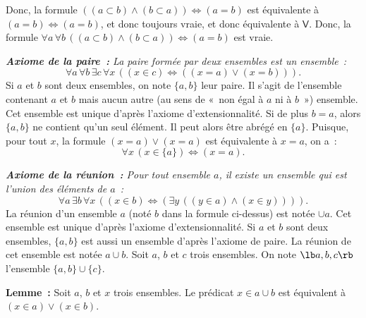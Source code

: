     Donc, la formule $((a \subset b) \wedge (b \subset a)) \Leftrightarrow (a = b)$ est équivalente à $(a = b) \Leftrightarrow (a = b)$, et donc toujours vraie, et donc équivalente à $\mathsf{V}$. 
    Donc, la formule $\forall a \, \forall b \, ((a \subset b) \wedge (b \subset a)) \Leftrightarrow (a = b)$ est vraie. 

    \done

\medskip

\noindent\textit{\textbf{Axiome de la paire :} La paire formée par deux ensembles est un ensemble :}
\begin{equation*}
    \forall a \, \forall b \, \exists c \, \forall x \, (
        (x \in c) \Leftrightarrow ((x = a) \vee (x = b))
    ).
\end{equation*}
Si $a$ et $b$ sont deux ensembles, on note $\lbrace a, b \rbrace$ leur paire. 
Il s'agit de l'ensemble contenant $a$ et $b$ mais aucun autre (au sens de « non égal à $a$ ni à $b$ ») ensemble. 
Cet ensemble est unique d'après l'axiome d'extensionnalité.
Si de plus $b = a$, alors $\lbrace a, b \rbrace$ ne contient qu'un seul élément. 
Il peut alors être abrégé en $\lbrace a \rbrace$. 
Puisque, pour tout $x$, la formule $(x = a) \vee (x=a)$ est équivalente à $x = a$, on a : 
\begin{equation*}
    \forall x \, (x \in \lbrace a \rbrace) \Leftrightarrow (x = a). 
\end{equation*}

\medskip

\noindent\textit{\textbf{Axiome de la réunion :} Pour tout ensemble $a$, il existe un ensemble qui est l'union des éléments de $a$ :}
\begin{equation*}
    \forall a \, \exists b \, \forall x \, (
        (x \in b) \Leftrightarrow (\exists y \, ((y \in a) \wedge (x \in y)))
    ).
\end{equation*}
La réunion d'un ensemble $a$ (noté $b$ dans la formule ci-dessus) est notée $\cup a$.
Cet ensemble est unique d'après l'axiome d'extensionnalité.
Si $a$ et $b$ sont deux ensembles, $\lbrace a, b \rbrace$ est aussi un ensemble d'après l'axiome de paire. 
La réunion de cet ensemble est notée $a \cup b$. 
Soit $a$, $b$ et $c$ trois ensembles. 
On note $\lb a, b, c \rb$ l'ensemble $\lbrace a, b \rbrace \cup \lbrace c \rbrace$. 

\medskip

\noindent\textbf{Lemme :} Soit $a$, $b$ et $x$ trois ensembles. 
    Le prédicat $x \in a \cup b$ est équivalent à $(x \in a) \vee (x \in b)$.

